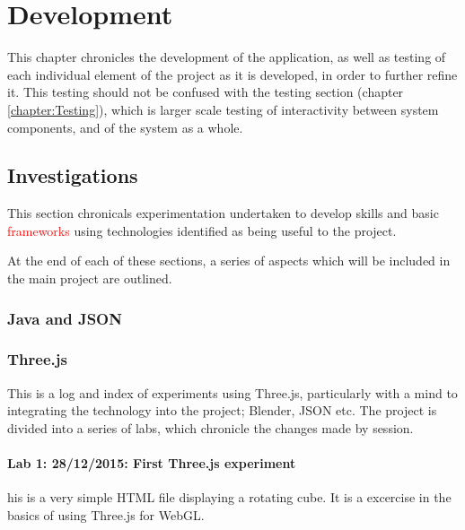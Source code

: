 \def\baselinestretch{1}

\chapter{Development}
\label{chapter:Development}

\def\baselinestretch{1.66}



This chapter chronicles the development of the application, as well as testing of each individual element of the project as it is developed, in order to further refine it. This testing should not be confused with the testing section (chapter \ref{chapter:Testing}), which is larger scale testing of interactivity between system components, and of the system as a whole.

\goodbreak

\section{Investigations}
\label{sec:Investigations}
This section chronicals experimentation undertaken to develop skills and basic \textcolor{red}{frameworks} using technologies identified as being useful to the project.

At the end of each of these sections, a series of aspects which will be included in the main project are outlined.

\subsection{Java and JSON}
\label{subSec:Java and JSON}

\subsection{Three.js}
\label{subSec:Three.js}
This is a log and index of experiments using Three.js, particularly with a mind to integrating the technology into the project; Blender, JSON etc. The project is divided into a series of labs, which chronicle the changes made by session.

\subsubsection{Lab 1: 28/12/2015: First Three.js experiment}
\label{subSubSec:ThreeJSExperiments:Lab1}
his is a very simple HTML file displaying a rotating cube. It is a excercise in the basics of using Three.js for WebGL.

